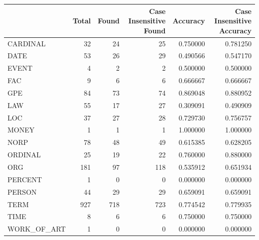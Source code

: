 \begin{tabular}{lrrrrr}
\toprule
 & Total & Found & Case Insensitive Found & Accuracy & Case Insensitive Accuracy \\
\midrule
CARDINAL & 32 & 24 & 25 & 0.750000 & 0.781250 \\
DATE & 53 & 26 & 29 & 0.490566 & 0.547170 \\
EVENT & 4 & 2 & 2 & 0.500000 & 0.500000 \\
FAC & 9 & 6 & 6 & 0.666667 & 0.666667 \\
GPE & 84 & 73 & 74 & 0.869048 & 0.880952 \\
LAW & 55 & 17 & 27 & 0.309091 & 0.490909 \\
LOC & 37 & 27 & 28 & 0.729730 & 0.756757 \\
MONEY & 1 & 1 & 1 & 1.000000 & 1.000000 \\
NORP & 78 & 48 & 49 & 0.615385 & 0.628205 \\
ORDINAL & 25 & 19 & 22 & 0.760000 & 0.880000 \\
ORG & 181 & 97 & 118 & 0.535912 & 0.651934 \\
PERCENT & 1 & 0 & 0 & 0.000000 & 0.000000 \\
PERSON & 44 & 29 & 29 & 0.659091 & 0.659091 \\
TERM & 927 & 718 & 723 & 0.774542 & 0.779935 \\
TIME & 8 & 6 & 6 & 0.750000 & 0.750000 \\
WORK_OF_ART & 1 & 0 & 0 & 0.000000 & 0.000000 \\
\bottomrule
\end{tabular}
